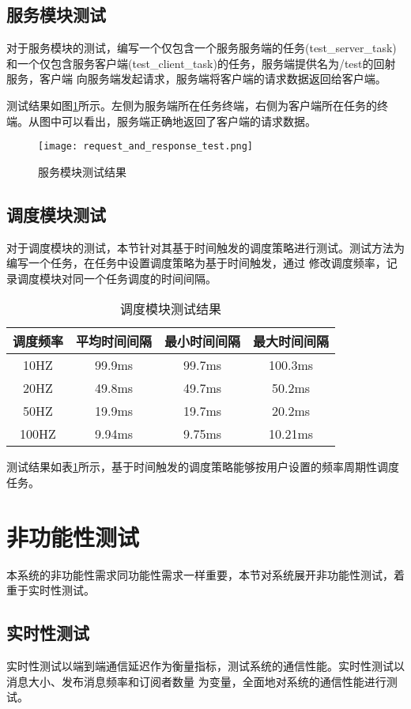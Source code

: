 \subsection{服务模块测试}
对于服务模块的测试，编写一个仅包含一个服务服务端的任务(test\_server\_task)和一个仅包含服务客户端(test\_client\_task)的任务，服务端提供名为/test的回射服务，客户端
向服务端发起请求，服务端将客户端的请求数据返回给客户端。


测试结果如图\ref{request_and_response_test}所示。左侧为服务端所在任务终端，右侧为客户端所在任务的终端。从图中可以看出，服务端正确地返回了客户端的请求数据。
\begin{figure}[H]
  \centering
  \texttt{[image: request\_and\_response\_test.png]}
  \caption{服务模块测试结果}
  \label{request_and_response_test}
\end{figure}

\subsection{调度模块测试}
对于调度模块的测试，本节针对其基于时间触发的调度策略进行测试。测试方法为编写一个任务，在任务中设置调度策略为基于时间触发，通过
修改调度频率，记录调度模块对同一个任务调度的时间间隔。
\begin{table}[H]
  \centering\small
  \caption{调度模块测试结果}
  \label{scheduler_test_result}
  \begin{tabular}{cccc}
    \toprule
    调度频率 & 平均时间间隔 & 最小时间间隔 & 最大时间间隔\\
    \midrule
    10HZ & 99.9ms & 99.7ms & 100.3ms \\
    20HZ & 49.8ms & 49.7ms & 50.2ms\\
    50HZ & 19.9ms& 19.7ms & 20.2ms\\
    100HZ & 9.94ms& 9.75ms & 10.21ms\\
    \bottomrule
  \end{tabular}
\end{table}
测试结果如表\ref{scheduler_test_result}所示，基于时间触发的调度策略能够按用户设置的频率周期性调度任务。

\section{非功能性测试}
本系统的非功能性需求同功能性需求一样重要，本节对系统展开非功能性测试，着重于实时性测试。

\subsection{实时性测试}
实时性测试以端到端通信延迟作为衡量指标，测试系统的通信性能。实时性测试以消息大小、发布消息频率和订阅者数量
为变量，全面地对系统的通信性能进行测试。
